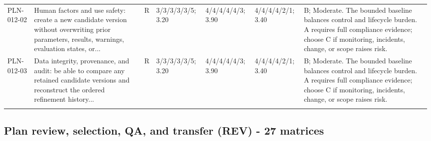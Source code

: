 \documentclass[11pt,letterpaper]{article}
\begin{document}
\begin{scriptsize}
\begin{longtable}{@{}L{0.11\textwidth}L{0.165\textwidth}L{0.04\textwidth}L{0.115\textwidth}L{0.115\textwidth}L{0.115\textwidth}L{0.235\textwidth}@{}}
\addlinespace[2pt]
PLN-012-02 & Human factors and use safety: create a new candidate version without overwriting prior parameters, results, warnings, evaluation states, or... & R & 3/3/3/3/3/5; 3.20 & 4/4/4/4/4/3; 3.90 & 4/4/4/4/2/1; 3.40 & B; Moderate. The bounded baseline balances control and lifecycle burden. A requires full compliance evidence; choose C if monitoring, incidents, change, or scope raises risk. \\
\addlinespace[2pt]
PLN-012-03 & Data integrity, provenance, and audit: be able to compare any retained candidate versions and reconstruct the ordered refinement history... & R & 3/3/3/3/3/5; 3.20 & 4/4/4/4/4/3; 3.90 & 4/4/4/4/2/1; 3.40 & B; Moderate. The bounded baseline balances control and lifecycle burden. A requires full compliance evidence; choose C if monitoring, incidents, change, or scope raises risk. \\
\addlinespace[2pt]
\end{longtable}
\end{scriptsize}

\subsection{Plan review, selection, QA, and transfer (REV) - 27 matrices}
\end{document}
